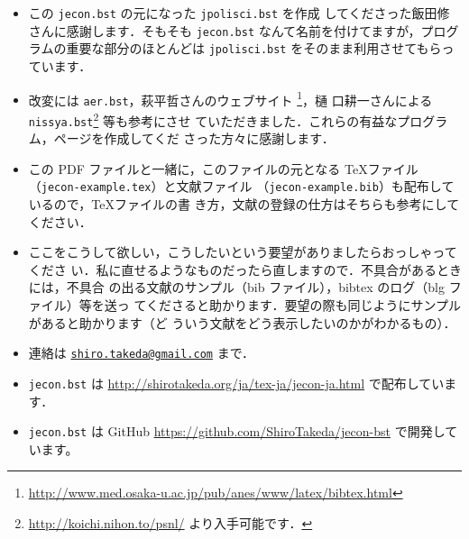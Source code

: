 \documentclass[a4j,10pt]{jarticle}
\begin{document}
\begin{itemize}
 \item この \texttt{jecon.bst} の元になった \texttt{jpolisci.bst} を作成
       してくださった飯田修さんに感謝します．そもそも \texttt{jecon.bst} 
       なんて名前を付けてますが，プログラムの重要な部分のほとんどは
       \texttt{jpolisci.bst} をそのまま利用させてもらっています．
 \item 改変には \texttt{aer.bst}，萩平哲さんのウェブサイト
       \footnote{
       \url{http://www.med.osaka-u.ac.jp/pub/anes/www/latex/bibtex.html}}，樋
       口耕一さんによる \texttt{nissya.bst}\footnote{
       \url{http://koichi.nihon.to/psnl/} より入手可能です．} 等も参考にさせ
       ていただきました．これらの有益なプログラム，ページを作成してくだ
       さった方々に感謝します．
 \item この PDF ファイルと一緒に，このファイルの元となる \TeX ファイル 
      （\texttt{jecon-example.tex}）と文献ファイル 
      （\texttt{jecon-example.bib}）も配布しているので，\TeX ファイルの書
       き方，文献の登録の仕方はそちらも参考にしてください．
 \item ここをこうして欲しい，こうしたいという要望がありましたらおっしゃってくださ
       い．私に直せるようなものだったら直しますので．不具合があるときには，不具合
       の出る文献のサンプル（bib ファイル），bibtex のログ（blg ファイル）等を送っ
       てくださると助かります．要望の際も同じようにサンプルがあると助かります（ど
       ういう文献をどう表示したいのかがわかるもの）．
 \item 連絡は \texttt{\href{mailto:shiro.takeda@gmail.com}{shiro.takeda@gmail.com}} まで．
 \item \texttt{jecon.bst} は 
       \url{http://shirotakeda.org/ja/tex-ja/jecon-ja.html} で配布しています．
 \item \texttt{jecon.bst} は GitHub
       \url{https://github.com/ShiroTakeda/jecon-bst} で開発しています。
\end{itemize}

\nocite{*}


% 
% 

%

% 
\end{document}
